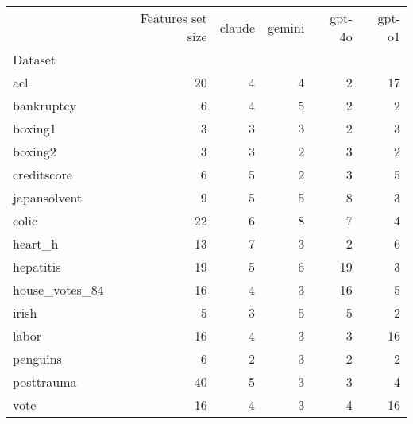 \begin{tabular}{lrrrrr}
\toprule
 & Features set size & claude & gemini & gpt-4o & gpt-o1 \\
Dataset &  &  &  &  &  \\
\midrule
acl & 20 & 4 & 4 & 2 & 17 \\
bankruptcy & 6 & 4 & 5 & 2 & 2 \\
boxing1 & 3 & 3 & 3 & 2 & 3 \\
boxing2 & 3 & 3 & 2 & 3 & 2 \\
creditscore & 6 & 5 & 2 & 3 & 5 \\
japansolvent & 9 & 5 & 5 & 8 & 3 \\
colic & 22 & 6 & 8 & 7 & 4 \\
heart\_h & 13 & 7 & 3 & 2 & 6 \\
hepatitis & 19 & 5 & 6 & 19 & 3 \\
house\_votes\_84 & 16 & 4 & 3 & 16 & 5 \\
irish & 5 & 3 & 5 & 5 & 2 \\
labor & 16 & 4 & 3 & 3 & 16 \\
penguins & 6 & 2 & 3 & 2 & 2 \\
posttrauma & 40 & 5 & 3 & 3 & 4 \\
vote & 16 & 4 & 3 & 4 & 16 \\
\bottomrule
\end{tabular}
